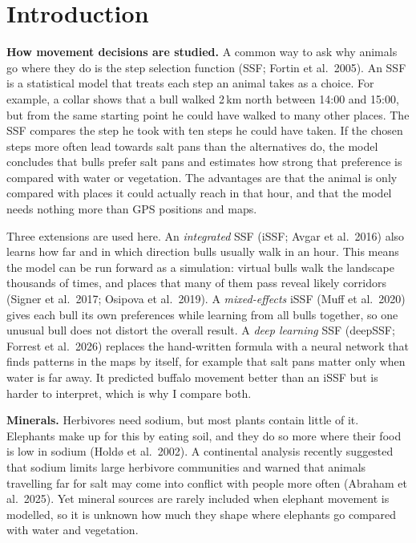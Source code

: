\documentclass[11pt,a4paper]{article}
\begin{document}
\section{Introduction}
\textbf{How movement decisions are studied.} A common way to ask why animals go where they do is the step selection function (SSF; Fortin et al.\ 2005). An SSF is a statistical model that treats each step an animal takes as a choice. For example, a collar shows that a bull walked 2\,km north between 14:00 and 15:00, but from the same starting point he could have walked to many other places. The SSF compares the step he took with ten steps he could have taken. If the chosen steps more often lead towards salt pans than the alternatives do, the model concludes that bulls prefer salt pans and estimates how strong that preference is compared with water or vegetation. The advantages are that the animal is only compared with places it could actually reach in that hour, and that the model needs nothing more than GPS positions and maps.

Three extensions are used here. An \textit{integrated} SSF (iSSF; Avgar et al.\ 2016) also learns how far and in which direction bulls usually walk in an hour. This means the model can be run forward as a simulation: virtual bulls walk the landscape thousands of times, and places that many of them pass reveal likely corridors (Signer et al.\ 2017; Osipova et al.\ 2019). A \textit{mixed-effects} iSSF (Muff et al.\ 2020) gives each bull its own preferences while learning from all bulls together, so one unusual bull does not distort the overall result. A \textit{deep learning} SSF (deepSSF; Forrest et al.\ 2026) replaces the hand-written formula with a neural network that finds patterns in the maps by itself, for example that salt pans matter only when water is far away. It predicted buffalo movement better than an iSSF but is harder to interpret, which is why I compare both.

\textbf{Minerals.} Herbivores need sodium, but most plants contain little of it. Elephants make up for this by eating soil, and they do so more where their food is low in sodium (Holdø et al.\ 2002). A continental analysis recently suggested that sodium limits large herbivore communities and warned that animals travelling far for salt may come into conflict with people more often (Abraham et al.\ 2025). Yet mineral sources are rarely included when elephant movement is modelled, so it is unknown how much they shape where elephants go compared with water and vegetation.
\end{document}
